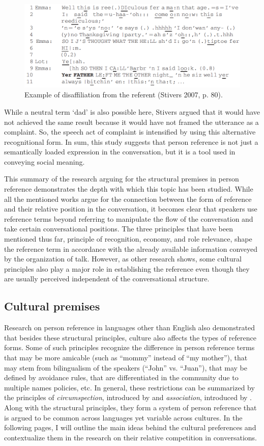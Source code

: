 \documentclass[12pt, draft]{article}
\begin{document}
\begin{figure}[h]
\caption{Example of disaffiliation from the referent (Stivers 2007, p. 80).}
\label{stivers}
\includegraphics[width=5in]{stivers.png}
\end{figure}
While a neutral term `dad' is also possible here, Stivers argued that it would have not achieved the same result because it would have not framed the utterance as a complaint. So, the speech act of complaint is intensified by using this alternative recognitional form. In sum, this study suggests that person reference is not just a semantically loaded expression in the conversation, but it is a tool used in conveying social meaning. 

This summary of the research arguing for the structural premises in person reference demonstrates the depth with which this topic has been studied. While all the mentioned works argue for the connection between the form of reference and their relative position in the conversation, it becomes clear that speakers use reference terms beyond referring to manipulate the flow of the conversation and take certain conversational positions. The three principles that have been mentioned thus far, principle of recognition, economy, and role relevance, shape the reference term in accordance with the already available information conveyed by the organization of talk. However, as other research shows, some cultural principles also play a major role in establishing the reference even though they are usually perceived independent of the conversational structure. 
\subsection{Cultural premises}
Research on person reference in languages other than English also demonstrated that besides these structural principles, culture also affects the types of reference forms. Some of such principles recognize the difference in person reference terms that may be more amicable (such as ``mommy'' instead of ``my mother''), that may stem from bilingualism of the speakers (``John'' vs. ``Juan''), that may be defined by avoidance rules, that are differentiated in the community due to multiple names policies, etc. In general, these restrictions can be summarized by the principles of \textit{circumspection}, introduced by \textcite{levinson2007} and \textit{association}, introduced by \textcite{brown2007}. Along with the structural principles, they form a system of person reference that is argued to be common across languages yet variable across cultures. In the following pages, I will outline the main ideas behind the cultural preferences and contextualize them in the research on their relative competition in conversations.  
\end{document}
